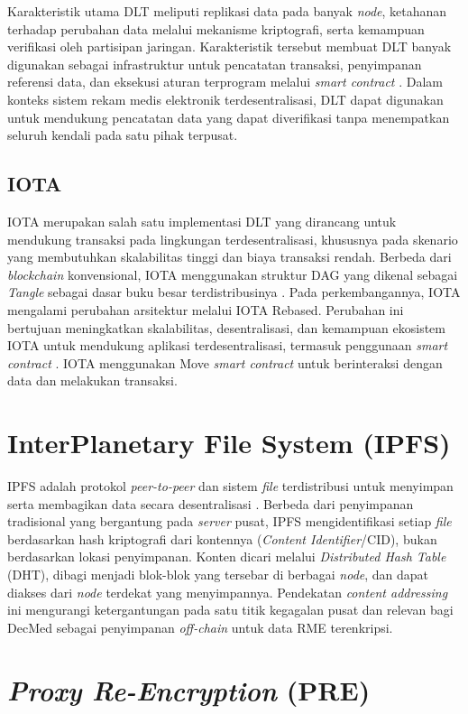 \documentclass[bahasa, 12pt, a4paper, onecolumn, oneside, final]{report}
\begin{document}
Karakteristik utama DLT meliputi replikasi data pada banyak \textit{node}, ketahanan terhadap perubahan data melalui mekanisme kriptografi, serta kemampuan verifikasi oleh partisipan jaringan. Karakteristik tersebut membuat DLT banyak digunakan sebagai infrastruktur untuk pencatatan transaksi, penyimpanan referensi data, dan eksekusi aturan terprogram melalui \textit{smart contract} \autocite{savadatti2025survey}. Dalam konteks sistem rekam medis elektronik terdesentralisasi, DLT dapat digunakan untuk mendukung pencatatan data yang dapat diverifikasi tanpa menempatkan seluruh kendali pada satu pihak terpusat.

\subsection{IOTA}
\label{subsec:iota}

IOTA merupakan salah satu implementasi DLT yang dirancang untuk mendukung transaksi pada lingkungan terdesentralisasi, khususnya pada skenario yang membutuhkan skalabilitas tinggi dan biaya transaksi rendah. Berbeda dari \textit{blockchain} konvensional, IOTA menggunakan struktur DAG yang dikenal sebagai \textit{Tangle} sebagai dasar buku besar terdistribusinya \autocite{sedi2025from}. Pada perkembangannya, IOTA mengalami perubahan arsitektur melalui IOTA Rebased. Perubahan ini bertujuan meningkatkan skalabilitas, desentralisasi, dan kemampuan ekosistem IOTA untuk mendukung aplikasi terdesentralisasi, termasuk penggunaan \textit{smart contract} \autocite{sedi2025from}. IOTA menggunakan Move \textit{smart contract} untuk berinteraksi dengan data dan melakukan transaksi.

\section{InterPlanetary File System (IPFS)}
\label{sec:ipfs}

IPFS adalah protokol \textit{peer-to-peer} dan sistem \textit{file} terdistribusi untuk menyimpan serta membagikan data secara desentralisasi \autocite{benet2014ipfs}. Berbeda dari penyimpanan tradisional yang bergantung pada \textit{server} pusat, IPFS mengidentifikasi setiap \textit{file} berdasarkan hash kriptografi dari kontennya (\textit{Content Identifier}/CID), bukan berdasarkan lokasi penyimpanan. Konten dicari melalui \textit{Distributed Hash Table} (DHT), dibagi menjadi blok-blok yang tersebar di berbagai \textit{node}, dan dapat diakses dari \textit{node} terdekat yang menyimpannya. Pendekatan \textit{content addressing} ini mengurangi ketergantungan pada satu titik kegagalan pusat dan relevan bagi DecMed sebagai penyimpanan \textit{off-chain} untuk data RME terenkripsi. \section{\textit{Proxy Re-Encryption} (PRE)}
\label{sec:proxy-re-encryption}
\end{document}
